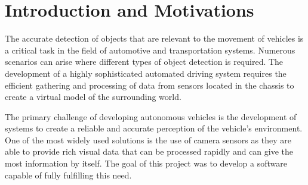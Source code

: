 \documentclass[11pt,a4paper,twoside,openright]{report}  %
\begin{document}

%
%


\selectthesislanguage


\renewcommand{\thesection}{\arabic{section}}
\renewcommand{\thesubsection}{\thesection.\arabic{subsection}}
\renewcommand{\thesubsubsection}{\thesubsection.\arabic{subsubsection}}
\tableofcontents\cleardoublepage




\section{Introduction and Motivations}\label{sec:introduction}
The accurate detection of objects that are relevant to the movement of vehicles is a critical task in the field of automotive and transportation systems.
Numerous scenarios can arise where different types of object detection is required.
The development of a highly sophisticated automated driving system requires the efficient gathering and processing of data from sensors located in the chassis to create a virtual model of the surrounding world.

The primary challenge of developing autonomous vehicles is the development of systems  to create a reliable and accurate perception of the vehicle's environment.
One of the most widely used solutions is the use of camera sensors as they are able to
provide rich visual data that can be processed rapidly and can give the most information by itself. The goal of this project was to develop a software capable of fully fulfilling this need.
\end{document}
